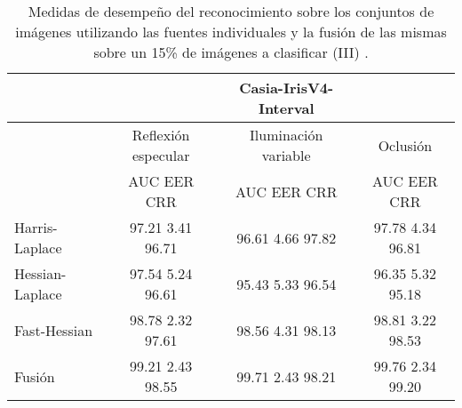 \begin{table}[h]
\begin{center}
\begin{tabular}{@{}lccc@{}}
\toprule
&& Casia-IrisV4-Interval & \\ \hline
&Reflexión especular		&  	Iluminación variable		& Oclusión \\ \hline
&AUC  \phantom{aa} EER  \phantom{aa} CRR &  	AUC  \phantom{aa} EER  \phantom{aa} CRR		& AUC  \phantom{aa} EER  \phantom{aa} CRR \\ \hline
Harris-Laplace& 97.21 \phantom{aa} 3.41  \phantom{aa} 96.71 &  	96.61 \phantom{aa} 4.66  \phantom{aa}97.82		& 97.78 \phantom{aa} 4.34 \phantom{aa} 96.81 \\
Hessian-Laplace& 97.54 \phantom{aa} 5.24  \phantom{aa} 96.61 &  	95.43 \phantom{aa} 5.33 \phantom{aa} 96.54 & 96.35 \phantom{aa} 5.32 \phantom{aa} 95.18\\
Fast-Hessian& 98.78  \phantom{aa}2.32 \phantom{aa}  97.61 &  	98.56 \phantom{aa} 4.31 \phantom{aa}98.13		& 98.81  \phantom{aa}3.22 \phantom{aa} 98.53 \\
Fusión& 99.21 \phantom{aa} 2.43  \phantom{aa}98.55 &  	99.71  \phantom{aa}2.43 \phantom{aa} 98.21		& 99.76 \phantom{aa} 2.34  \phantom{aa}99.20 \\ \hline

\end{tabular}
\end{center}
\caption{Medidas de desempeño del reconocimiento sobre los conjuntos de imágenes utilizando las fuentes individuales y la fusión de las mismas sobre un 15\% de imágenes a clasificar (III) .}
\label{my_tabla}
\end{table}

